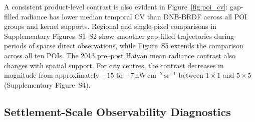 \documentclass[]{interact}
\theoremstyle{plain}%
\theoremstyle{definition}
\theoremstyle{remark}
\begin{document}
        A consistent product-level contrast is also evident in Figure~\ref{fig:poi_cv}: gap-filled radiance has lower median temporal CV than DNB-BRDF across all POI groups and kernel supports. Regional and single-pixel comparisons in Supplementary Figures~S1--S2 show smoother gap-filled trajectories during periods of sparse direct observations, while Figure~S5 extends the comparison across all ten POIs. The 2013 pre--post Haiyan mean radiance contrast also changes with spatial support. For city centres, the contrast decreases in magnitude from approximately $-15$ to $-7\,\mathrm{nW\,cm^{-2}\,sr^{-1}}$ between $1\times1$ and $5\times5$ (Supplementary Figure~S4).
    
    \subsection{Settlement-Scale Observability Diagnostics}
    
\end{document}
